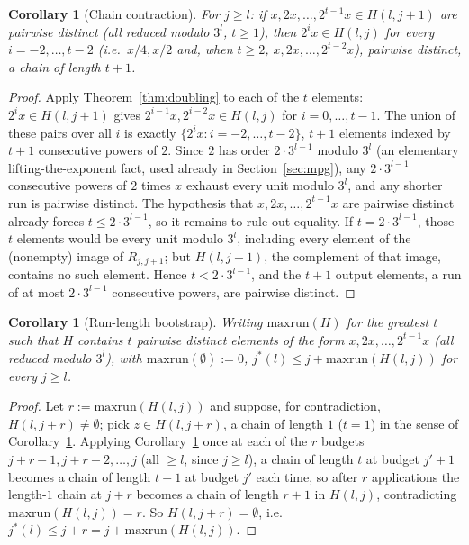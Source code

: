 \documentclass[11pt]{amsart}
\theoremstyle{plain}
\newtheorem{corollary}[theorem]{Corollary}
\theoremstyle{definition}
\theoremstyle{remark}
\begin{document}
\begin{corollary}[Chain contraction]
\label{cor:chain}
For $j\ge l$: if $x, 2x, \dots, 2^{t-1}x \in H(l,j+1)$ are pairwise distinct (all reduced modulo
$3^l$, $t\ge1$), then $2^ix \in H(l,j)$ for every $i=-2,\dots,t-2$ (i.e.\ $x/4,x/2$ and, when $t\ge2$,
$x,2x,\dots,2^{t-2}x$), pairwise distinct, a chain of length $t+1$.
\end{corollary}

\begin{proof}
Apply Theorem~\ref{thm:doubling} to each of the $t$ elements: $2^ix\in H(l,j+1)$ gives
$2^{i-1}x, 2^{i-2}x\in H(l,j)$ for $i=0,\dots,t-1$. The union of these pairs over all $i$ is exactly
$\{2^ix : i=-2,\dots,t-2\}$, $t+1$ elements indexed by $t+1$ consecutive powers of $2$. Since $2$
has order $2\cdot3^{l-1}$ modulo $3^l$ (an elementary lifting-the-exponent fact, used already in
Section~\ref{sec:mpg}), any $2\cdot3^{l-1}$ consecutive powers of $2$ times $x$ exhaust every unit
modulo $3^l$, and any shorter run is pairwise distinct. The hypothesis that $x,2x,\dots,2^{t-1}x$ are
pairwise distinct already forces $t\le2\cdot3^{l-1}$, so it remains to rule out equality. If
$t=2\cdot3^{l-1}$, those $t$ elements would be every unit modulo $3^l$, including every element of
the (nonempty) image of $R_{j,j+1}$; but $H(l,j+1)$, the complement of that image, contains no such
element. Hence $t<2\cdot3^{l-1}$, and the $t+1$ output elements, a run of at most $2\cdot3^{l-1}$
consecutive powers, are pairwise distinct.
\end{proof}

\begin{corollary}[Run-length bootstrap]
\label{cor:bootstrap}
Writing $\mathrm{maxrun}(H)$ for the greatest $t$ such that $H$ contains $t$ pairwise distinct
elements of the form $x,2x,\dots,2^{t-1}x$ (all reduced modulo $3^l$), with
$\mathrm{maxrun}(\emptyset):=0$, $j^*(l) \le j + \mathrm{maxrun}(H(l,j))$ for every $j\ge l$.
\end{corollary}

\begin{proof}
Let $r:=\mathrm{maxrun}(H(l,j))$ and suppose, for contradiction, $H(l,j+r)\ne\emptyset$; pick
$z\in H(l,j+r)$, a chain of length $1$ ($t=1$) in the sense of Corollary~\ref{cor:chain}. Applying
Corollary~\ref{cor:chain} once at each of the $r$ budgets $j+r-1,j+r-2,\dots,j$ (all $\ge l$, since
$j\ge l$), a chain of length $t$ at budget $j'+1$ becomes a chain of length $t+1$ at budget $j'$
each time, so after $r$ applications the length-$1$ chain at $j+r$ becomes a chain of length $r+1$
in $H(l,j)$, contradicting $\mathrm{maxrun}(H(l,j))=r$. So $H(l,j+r)=\emptyset$, i.e.\
$j^*(l)\le j+r=j+\mathrm{maxrun}(H(l,j))$.
\end{proof}
\end{document}

